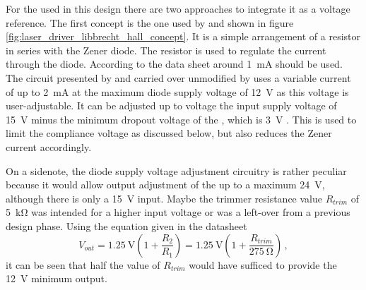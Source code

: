 For the  used in this design there are two approaches to integrate it as a voltage reference. The first concept is the one used by \citeauthor{libbrecht_hall} \cite{libbrecht_hall} and shown in figure \ref{fig:laser_driver_libbrecht_hall_concept}. It is a simple arrangement of a resistor in series with the Zener diode. The resistor is used to regulate the current through the diode. According to the data sheet around \qty{1}{\mA} \cite{datasheet_LM399} should be used. The circuit presented by \cite{libbrecht_hall} and carried over unmodified by \citeauthor{laser_driver_mosfet_noise} \cite{laser_driver_mosfet_noise} uses a variable current of up to \qty{2}{\mA} at the maximum diode supply voltage of \qty{12}{\V} as this voltage is user-adjustable. It can be adjusted up to voltage the input supply voltage of \qty{15}{\V} minus the minimum dropout voltage of the , which is \qty{3}{\V} \cite{datasheet_LM317}. This is used to limit the compliance voltage as discussed below, but also reduces the Zener current accordingly.

On a sidenote, the diode supply voltage adjustment circuitry is rather peculiar because it would allow output adjustment of the  up to a maximum \qty{24}{\V}, although there is only a \qty{15}{\V} input. Maybe the trimmer resistance value $R_{trim}$ of \qty{5}{\kilo \ohm} was intended for a higher input voltage or was a left-over from a previous design phase. Using the equation given in the datasheet \cite{datasheet_LM317}
\begin{equation*}
    V_{out} = \qty{1.25}{\V} \left( 1 + \frac{R_2}{R_1} \right) = \qty{1.25}{\V} \left( 1 + \frac{R_{trim}}{\qty{275}{\ohm}} \right) \,,
\end{equation*}
it can be seen that half the value of $R_{trim}$ would have sufficed to provide the \qty{12}{\V} minimum output.

